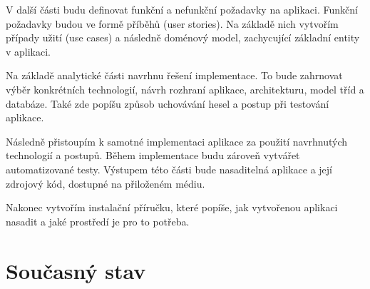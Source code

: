 \documentclass[thesis=B,czech]{FITthesis}[2012/06/26]
\begin{document}
		V další části budu definovat funkční a nefunkční požadavky na aplikaci. Funkční požadavky budou ve formě příběhů (user stories). Na základě nich vytvořím případy užití (use cases) a následně doménový model, zachycující základní entity v aplikaci.
		
		Na základě analytické části navrhnu řešení implementace. To bude zahrnovat výběr konkrétních technologií, návrh rozhraní aplikace, architekturu, model tříd a databáze. Také zde popíšu způsob uchovávání hesel a postup při testování aplikace.

		Následně přistoupím k samotné implementaci aplikace za použití navrhnutých technologií a postupů. Během implementace budu zároveň vytvářet automatizované testy. Výstupem této části bude nasaditelná aplikace a její zdrojový kód, dostupné na přiloženém médiu. 
		
		Nakonec vytvořím instalační příručku, které popíše, jak vytvořenou aplikaci nasadit a jaké prostředí je pro to potřeba.
		
%		
\chapter{Současný stav}
	\label{chapter:current-state}
\end{document}
